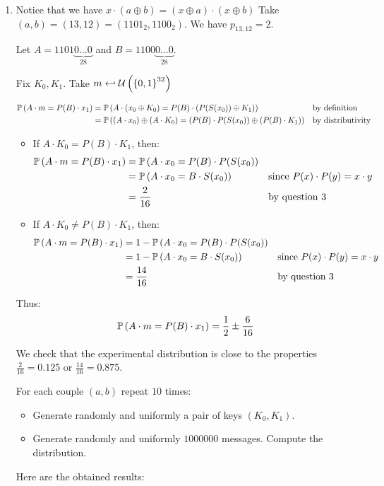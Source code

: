\begin{enumerate}[label=\textbf{\arabic*})]
    \item
    Notice that we have $x \cdot (a \oplus b) = (x \oplus a)\cdot(x \oplus b)$
    Take $(a, b) = (13, 12) = (1101_2, 1100_2)$. We have $p_{13, 12} = 2$.

    Let $A = 1101\underbrace{0\dots0}_{28}$ and $B = 1100\underbrace{0\dots0}_{28}$.

    Fix $K_0, K_1$. Take $m \hookleftarrow \mathcal{U}\left(\left\{ 0,1 \right\}^{32}\right)$

    \begin{align*}
        \mathbb{P}\left( A\cdot m = P(B)\cdot x_1 \right) &= \mathbb{P}\left( A\cdot (x_0 \oplus K_0) = P(B) \cdot (P(S(x_0))\oplus K_1) \right) && \text{by definition}\\
            &= \mathbb{P}\left( (A\cdot x_0) \oplus (A \cdot K_0) = (P(B) \cdot P(S(x_0)) \oplus (P(B) \cdot K_1) \right) && \text{by distributivity}\\
    \end{align*}

    \begin{itemize}
        \item If $A \cdot K_0 = P(B) \cdot K_1$, then:
        \begin{align*}
            \mathbb{P}\left( A\cdot m = P(B)\cdot x_1 \right) &= \mathbb{P}\left( A\cdot x_0 = P(B) \cdot P(S(x_0) \right)\\
                &= \mathbb{P}\left( A\cdot x_0 = B \cdot S(x_0) \right) && \text{since } P(x) \cdot P(y) = x \cdot y\\
                &= \frac{2}{16} && \text{by question 3}
        \end{align*}
        \item If $A \cdot K_0 \neq P(B) \cdot K_1$, then:
        \begin{align*}
            \mathbb{P}\left( A\cdot m = P(B)\cdot x_1 \right) &= 1-\mathbb{P}\left( A\cdot x_0 = P(B) \cdot P(S(x_0) \right)\\
                &= 1-\mathbb{P}\left( A\cdot x_0 = B \cdot S(x_0) \right) && \text{since } P(x) \cdot P(y) = x \cdot y\\
                &= \frac{14}{16} && \text{by question 3}
        \end{align*}
    \end{itemize}
    Thus:
    \[\mathbb{P}\left( A\cdot m = P(B)\cdot x_1 \right) = \frac{1}{2} \pm \frac{6}{16}\]

    We check that the experimental distribution is close to the properties $\frac{2}{16} = 0.125$ or $\frac{14}{16} = 0.875$.

    For each couple $(a, b)$ repeat $10$ times:
    \begin{itemize}
        \item Generate randomly and uniformly a pair of keys $(K_0, K_1)$.
        \item Generate randomly and uniformly $1000000$ messages. Compute the distribution.
    \end{itemize}
    Here are the obtained results:


\end{enumerate}
